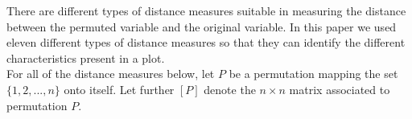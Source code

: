 \documentclass[12]{report}
\begin{document}
%

There are different types of distance measures suitable in measuring the distance between the permuted variable and the original variable. In this paper we used eleven different types of distance measures so that they can identify the different characteristics present in a plot. \\

For all of the distance measures below, let $P$ be a permutation mapping  the set $\{1, 2, ..., n\}$ onto itself. Let further $[P]$ denote the $n \times n$ matrix associated to permutation $P$.
\end{document}
